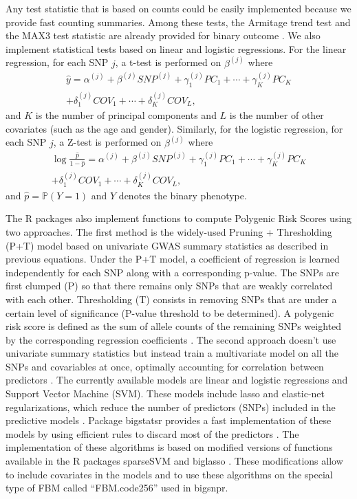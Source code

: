 \documentclass{bioinfo}
\begin{document}
\begin{methods}
Any test statistic that is based on counts could be easily implemented because we provide fast counting summaries. Among these tests, the Armitage trend test and the MAX3 test statistic are already provided for binary outcome \cite[]{Zheng2012}. 
We also implement statistical tests based on linear and logistic regressions. For the linear regression, for each SNP $j$, a t-test is performed on $\beta^{(j)}$ where
\begin{multline}
  \hat{y} = \alpha^{(j)} + \beta^{(j)} SNP^{(j)} + \gamma_1^{(j)} PC_1 + \cdots + \gamma_K^{(j)} PC_K \\ + \delta_1^{(j)} COV_1 + \cdots + \delta_K^{(j)} COV_L,
\end{multline}
and $K$ is the number of principal components and $L$ is the number of other covariates (such as the age and gender). Similarly, for the logistic regression, for each SNP $j$, a Z-test is performed on $\beta^{(j)}$ where
\begin{multline}
  \log{\frac{\hat{p}}{1-\hat{p}}} = \alpha^{(j)} + \beta^{(j)} SNP^{(j)} + \gamma_1^{(j)} PC_1 + \cdots + \gamma_K^{(j)} PC_K \\ + \delta_1^{(j)} COV_1 + \cdots + \delta_K^{(j)} COV_L,
\end{multline}
and $\hat{p} = \mathbb{P}(Y = 1)$ and $Y$ denotes the binary phenotype.

The R packages also implement functions to compute Polygenic Risk Scores using two approaches. 
The first method is the widely-used Pruning + Thresholding (P+T) model based on univariate GWAS summary statistics as described in previous equations. Under the P+T model, a coefficient of regression is learned independently for each SNP along with a corresponding p-value. The SNPs are first clumped (P) so that there remains only SNPs that are weakly correlated with each other. Thresholding (T) consists in removing SNPs that are under a certain level of significance (P-value threshold to be determined). A polygenic risk score is defined as the sum of allele counts of the remaining SNPs weighted by the corresponding regression coefficients \cite[]{Chatterjee2013,Dudbridge2013,Golan2014}. 
The second approach doesn't use univariate summary statistics but instead train a multivariate model on all the SNPs and covariables at once, optimally accounting for correlation between predictors \cite[]{Abraham2012}. The currently available models are linear and logistic regressions and Support Vector Machine (SVM). These models include lasso and elastic-net regularizations, which reduce the number of  predictors (SNPs) included in the predictive models \cite[]{Friedman2010,Tibshirani1996,Zou2005}. Package bigstatsr provides a fast implementation of these models by using efficient rules to discard most of the predictors \cite[]{Tibshirani2012}. The implementation of these algorithms is based on modified versions of functions available in the R packages sparseSVM and biglasso \cite[]{Zeng2017}. These modifications allow to include covariates in the models and to use these algorithms on the special type of FBM called ``FBM.code256'' used in bigsnpr.


\end{methods}
\end{document}
